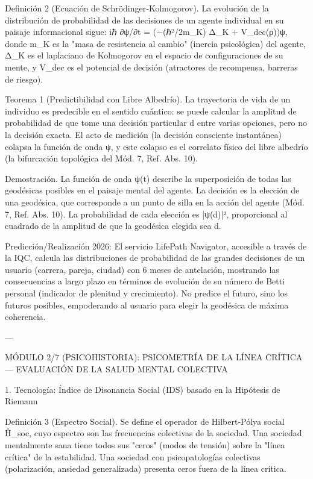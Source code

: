 \documentclass[12pt,twoside]{book}
\begin{document}
Definición 2 (Ecuación de Schrödinger‑Kolmogorov). La evolución de la distribución de probabilidad de las decisiones de un agente individual en su paisaje informacional sigue:
iℏ ∂ψ/∂t = (−(ℏ²/2m_K) Δ_K + V_dec(ρ))ψ,
donde m_K es la "masa de resistencia al cambio" (inercia psicológica) del agente, Δ_K es el laplaciano de Kolmogorov en el espacio de configuraciones de su mente, y V_dec es el potencial de decisión (atractores de recompensa, barreras de riesgo).

Teorema 1 (Predictibilidad con Libre Albedrío). La trayectoria de vida de un individuo es predecible en el sentido cuántico: se puede calcular la amplitud de probabilidad de que tome una decisión particular d entre varias opciones, pero no la decisión exacta. El acto de medición (la decisión consciente instantánea) colapsa la función de onda ψ, y este colapso es el correlato físico del libre albedrío (la bifurcación topológica del Mód. 7, Ref. Abs. 10).

Demostración. La función de onda ψ(t) describe la superposición de todas las geodésicas posibles en el paisaje mental del agente. La decisión es la elección de una geodésica, que corresponde a un punto de silla en la acción del agente (Mód. 7, Ref. Abs. 10). La probabilidad de cada elección es |ψ(d)|², proporcional al cuadrado de la amplitud de que la geodésica elegida sea d.

Predicción/Realización 2026: El servicio LifePath Navigator, accesible a través de la IQC, calcula las distribuciones de probabilidad de las grandes decisiones de un usuario (carrera, pareja, ciudad) con 6 meses de antelación, mostrando las consecuencias a largo plazo en términos de evolución de su número de Betti personal (indicador de plenitud y crecimiento). No predice el futuro, sino los futuros posibles, empoderando al usuario para elegir la geodésica de máxima coherencia.

---

MÓDULO 2/7 (PSICOHISTORIA): PSICOMETRÍA DE LA LÍNEA CRÍTICA — EVALUACIÓN DE LA SALUD MENTAL COLECTIVA

1. Tecnología: Índice de Disonancia Social (IDS) basado en la Hipótesis de Riemann

Definición 3 (Espectro Social). Se define el operador de Hilbert‑Pólya social Ĥ_soc, cuyo espectro son las frecuencias colectivas de la sociedad. Una sociedad mentalmente sana tiene todos sus "ceros" (modos de tensión) sobre la "línea crítica" de la estabilidad. Una sociedad con psicopatologías colectivas (polarización, ansiedad generalizada) presenta ceros fuera de la línea crítica.
\end{document}
